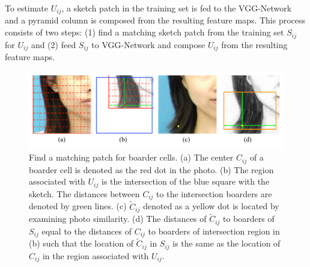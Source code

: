 \documentclass[10pt,twocolumn,letterpaper]{article}
\begin{document}
To estimate $U_{ij}$, a sketch patch in the training set is fed to the VGG-Network and a pyramid column is composed from the resulting feature maps. This process consists of two steps: (1) find a matching sketch patch from the training set $S_{ij}$ for $U_{ij}$ and (2) feed $S_{ij}$ to VGG-Network and compose $U_{ij}$ from the resulting feature maps.\par
\begin{figure}[htbp]
\centering
\includegraphics[width=0.99\linewidth]{img/border_example.pdf}
\caption{Find a matching patch for boarder cells. (a) The center $C_{ij}$ of a boarder cell is denoted as the red dot in the photo. (b) The region associated with $U_{ij}$ is the intersection of the blue square with the sketch. The distances between $C_{ij}$ to the intersection boarders are denoted by green lines. (c) $\tilde{C}_{ij}$ denoted as a yellow dot is located by examining photo similarity. (d) The distances of $\tilde{C}_{ij}$ to boarders of $S_{ij}$ equal to the distances of  $C_{ij}$ to boarders of intersection region in (b) such that the location of $\tilde{C}_{ij}$ in $S_{ij}$ is the same as the location of $C_{ij}$ in the region associated with $U_{ij}$.}
\label{fig:boarder_example}
\end{figure}
\end{document}
